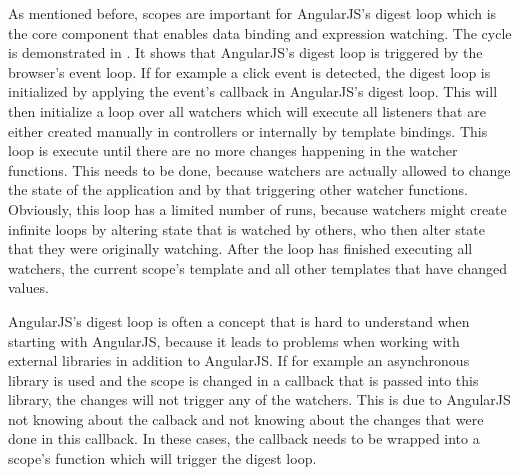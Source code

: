 As mentioned before, scopes are important for AngularJS's digest loop which is the core component that enables data binding and expression watching. The cycle is demonstrated in . It shows that AngularJS's digest loop is triggered by the browser's event loop. If for example a click event is detected, the digest loop is initialized by applying the event's callback in AngularJS's digest loop. This will then initialize a loop over all watchers which will execute all  listeners that are either created manually in controllers or internally by template bindings. This loop is execute until there are no more changes happening in the watcher functions. This needs to be done, because watchers are actually allowed to change the state of the application and by that triggering other watcher functions. Obviously, this loop has a limited number of runs, because watchers might create infinite loops by altering state that is watched by others, who then alter state that they were originally watching. After the loop has finished executing all watchers, the current scope's template and all other templates that have changed values.

AngularJS's digest loop is often a concept that is hard to understand when starting with AngularJS, because it leads to problems when working with external libraries in addition to AngularJS. If for example an asynchronous library is used and the scope is changed in a callback that is passed into this library, the changes will not trigger any of the watchers. This is due to AngularJS not knowing about the calback and not knowing about the changes that were done in this callback. In these cases, the callback needs to be wrapped into a scope's  function which will trigger the digest loop.